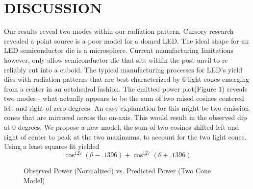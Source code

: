 \newpage
\section{DISCUSSION}
Our results reveal two modes within our radiation pattern. Cursory research revealed a point source is a poor model for a domed LED. The ideal shape for an LED semiconductor die is a microsphere. Current manufacturing limitations however, only allow semiconductor die that sits within the post-anvil to re reliably cut into a cuboid. The typical manufacturing processes for LED’s yield dies with radiation patterns that are best characterized by 6 light cones emerging from a center in an octahedral fashion. The emitted power plot(Figure 1) reveals two modes - what actually appears to be the sum of two raised cosines centered left and right of zero degrees. An easy explanation for this might be two emission cones that are mirrored across the on-axis. This would result in the observed dip at 0 degrees. We propose a new model, the sum of two cosines shifted left and right of center to peak at the two maximums, to account for the two light cones. Using a least squares fit yielded
\[\cos^{127}(\theta-.1396) + \cos^{127}(\theta+.1396)\]

\begin{figure}[H]
    \centering
{}
\caption{Observed Power (Normalized) vs. Predicted Power (Two Cone Model)}
\end{figure}


